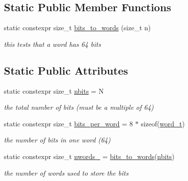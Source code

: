 \subsection*{Static Public Member Functions}
\begin{DoxyCompactItemize}
\item 
static constexpr size\+\_\+t \mbox{\hyperlink{classforte_1_1_bit_array_a95b9ef6120acba58b0131afb94538411}{bits\+\_\+to\+\_\+words}} (size\+\_\+t n)
\begin{DoxyCompactList}\small\item\em this tests that a word has 64 bits \end{DoxyCompactList}\end{DoxyCompactItemize}
\subsection*{Static Public Attributes}
\begin{DoxyCompactItemize}
\item 
static constexpr size\+\_\+t \mbox{\hyperlink{classforte_1_1_bit_array_a13866977deadcb098f2e5053025d12f0}{nbits}} = N
\begin{DoxyCompactList}\small\item\em the total number of bits (must be a multiple of 64) \end{DoxyCompactList}\item 
static constexpr size\+\_\+t \mbox{\hyperlink{classforte_1_1_bit_array_ad5ca62ac879b44e0e28017a73fd6c3fd}{bits\+\_\+per\+\_\+word}} = 8 $\ast$ sizeof(\mbox{\hyperlink{classforte_1_1_bit_array_a7f3b4ebbbe4bc80ce60cc6614cb565da}{word\+\_\+t}})
\begin{DoxyCompactList}\small\item\em the number of bits in one word (64) \end{DoxyCompactList}\item 
static constexpr size\+\_\+t \mbox{\hyperlink{classforte_1_1_bit_array_aeaa8016f00f9ffc5822081f7e45656e8}{nwords\+\_\+}} = \mbox{\hyperlink{classforte_1_1_bit_array_a95b9ef6120acba58b0131afb94538411}{bits\+\_\+to\+\_\+words}}(\mbox{\hyperlink{classforte_1_1_bit_array_a13866977deadcb098f2e5053025d12f0}{nbits}})
\begin{DoxyCompactList}\small\item\em the number of words used to store the bits \end{DoxyCompactList}\end{DoxyCompactItemize}
